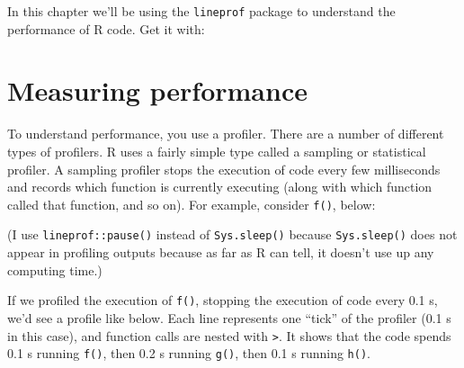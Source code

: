 In this chapter we'll be using the \texttt{lineprof} package to
understand the performance of R code. Get it with:

\begin{Shaded}
\begin{Highlighting}[]
\OperatorTok{::}\NormalTok{(}\NormalTok{)}
\end{Highlighting}
\end{Shaded}

\hypertarget{measure-perf}{%
\section{Measuring performance}\label{measure-perf}}

To understand performance, you use a profiler. There are a number of
different types of profilers. R uses a fairly simple type called a
sampling or statistical profiler. A sampling profiler stops the
execution of code every few milliseconds and records which function is
currently executing (along with which function called that function, and
so on). For example, consider \texttt{f()}, below: 

\begin{Shaded}
\begin{Highlighting}[]
\StringTok{ }\NormalTok{() \{}
  \NormalTok{(}\NormalTok{)}
  \NormalTok{()}
  \NormalTok{()}
\NormalTok{\}}
\StringTok{ }\NormalTok{() \{}
  \NormalTok{(}\NormalTok{)}
  \NormalTok{()}
\NormalTok{\}}
\StringTok{ }\NormalTok{() \{}
  \NormalTok{(}\NormalTok{)}
\NormalTok{\}}
\end{Highlighting}
\end{Shaded}

(I use \texttt{lineprof::pause()} instead of \texttt{Sys.sleep()}
because \texttt{Sys.sleep()} does not appear in profiling outputs
because as far as R can tell, it doesn't use up any computing time.)

If we profiled the execution of \texttt{f()}, stopping the execution of
code every 0.1 s, we'd see a profile like below. Each line represents
one ``tick'' of the profiler (0.1 s in this case), and function calls
are nested with \texttt{\textgreater{}}. It shows that the code spends
0.1 s running \texttt{f()}, then 0.2 s running \texttt{g()}, then 0.1 s
running \texttt{h()}.

